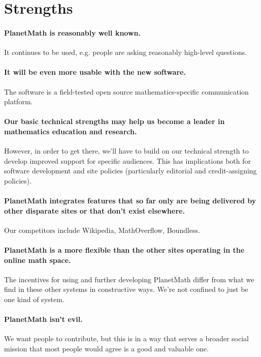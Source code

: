 \section*{Strengths}

\paragraph{PlanetMath is reasonably well known.}  It continues to be used,
e.g. people are asking reasonably high-level questions.

\paragraph{It will be even more usable with the new software.}  The software
is a field-tested open source mathematics-specific communication
platform.

\paragraph{Our basic technical strengths may help us become a leader in
  mathematics education and research.}  However, in order to get
there, we'll have to build on our technical strength to develop
improved support for specific audiences.  This has implications both
for software development and site policies (particularly editorial and
credit-assigning policies).

\paragraph{PlanetMath integrates features that so far only are being
  delivered by other disparate sites or that don't exist elsewhere.}
Our competitors include Wikipedia, MathOverflow, Boundless.

\paragraph{PlanetMath is a more flexible than the other sites operating in
  the online math space.}  The incentives for using and further
developing PlanetMath differ from what we find in these other systems
in constructive ways.  We're not confined to just be one kind of
system.

\paragraph{PlanetMath isn't evil.}  We want people to contribute, but this
is in a way that serves a broader social mission that most people
would agree is a good and valuable one.

